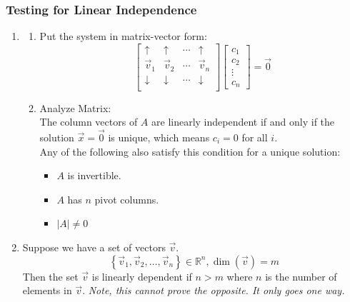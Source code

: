         \subsubsection{Testing for Linear Independence}
        \begin{enumerate}
        \item \begin{enumerate}
            \item Put the system in matrix-vector form:
                \[
                \left[ \begin{array}{cccc}
                    \uparrow & \uparrow & \cdots & \uparrow\\
                    \vec{v}_1 & \vec{v}_2 & \cdots & \vec{v}_n\\
                    \downarrow & \downarrow & \cdots & \downarrow\\
                \end{array} \right] \left[ \begin{array}{c}
                    c_1\\
                    c_2\\
                    \vdots\\
                    c_n
                \end{array}\right] = \vec{0}
                \]
            \item Analyze Matrix:\\
                The column vectors of $A$ are linearly independent if and only if the solution $\vec{x} = \vec{0}$ is unique, which means $c_i = 0$ for all $i$.\\
                Any of the following also satisfy this condition for a unique solution:
                    \begin{itemize}
                        \item $A$ is invertible.
                        \item $A$ has $n$ pivot columns.
                        \item $|A| \neq 0$
                    \end{itemize}
            \end{enumerate}
        \item Suppose we have a set of vectors $\vec{v}$.
            \[
                \left\{ \vec{v}_1, \vec{v}_2, \ldots, \vec{v}_n \right\} \in \mathbb{R}^n, \dim(\vec{v})=m
            \]
            Then the set $\vec{v}$ is linearly dependent if $n>m$ where $n$ is the number of elements in $\vec{v}$. \textit{Note, this cannot prove the opposite. It only goes one way.}

\end{enumerate}
